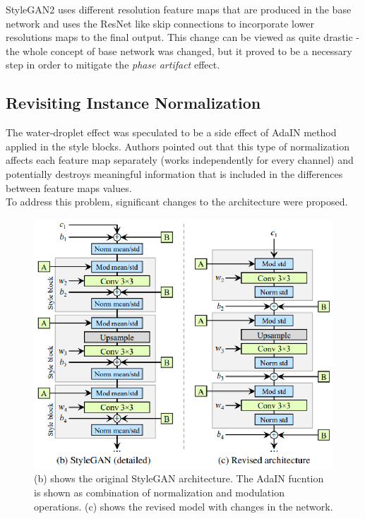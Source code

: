 \documentclass[11pt,a4paper,openany]{book}
\begin{document}
\noindent StyleGAN2 uses different resolution feature maps that are produced in the base network and uses the ResNet like skip connections to incorporate lower resolutions maps to the final output. This change can be viewed as quite drastic - the whole concept of base network was changed, but it proved to be a necessary step in order to mitigate the \textit{phase artifact} effect.

\subsection{Revisiting Instance Normalization}

\noindent The water-droplet effect was speculated to be a side effect of AdaIN method applied in the style blocks. Authors pointed out that this type of normalization affects each feature map separately (works independently for every channel) and potentially destroys meaningful information that is included in the differences between feature maps values. \\

\noindent To address this problem, significant changes to the architecture were proposed.

\begin{figure}[ht!]
    \centering
    \includegraphics[scale=1.3]{figs/changed-normalization.eps}
    \caption{(b) shows the original StyleGAN architecture. The AdaIN fucntion is shown as combination of normalization and modulation operations. (c) shows the revised model with changes in the network. \cite{stylegan2}}\label{Fig:STYLEGAN}
\end{figure}
\end{document}
